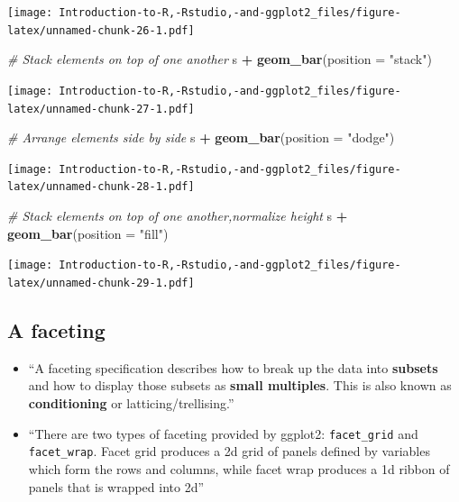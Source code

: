 \documentclass[]{book}
\newenvironment{Shaded}{\begin{snugshade}}{\end{snugshade}}
\newcommand{\CommentTok}[1]{\textcolor[rgb]{0.56,0.35,0.01}{\textit{#1}}}
\newcommand{\DataTypeTok}[1]{\textcolor[rgb]{0.13,0.29,0.53}{#1}}
\newcommand{\KeywordTok}[1]{\textcolor[rgb]{0.13,0.29,0.53}{\textbf{#1}}}
\newcommand{\NormalTok}[1]{#1}
\newcommand{\OperatorTok}[1]{\textcolor[rgb]{0.81,0.36,0.00}{\textbf{#1}}}
\newcommand{\StringTok}[1]{\textcolor[rgb]{0.31,0.60,0.02}{#1}}
\begin{document}
\texttt{[image: Introduction-to-R,-Rstudio,-and-ggplot2\_files/figure-latex/unnamed-chunk-26-1.pdf]}

\begin{Shaded}
\begin{Highlighting}[]
\CommentTok{# Stack elements on top of one another}
\NormalTok{s }\OperatorTok{+}\StringTok{ }\KeywordTok{geom_bar}\NormalTok{(}\DataTypeTok{position =} \StringTok{"stack"}\NormalTok{)}
\end{Highlighting}
\end{Shaded}

\texttt{[image: Introduction-to-R,-Rstudio,-and-ggplot2\_files/figure-latex/unnamed-chunk-27-1.pdf]}

\begin{Shaded}
\begin{Highlighting}[]
\CommentTok{# Arrange elements side by side}
\NormalTok{s }\OperatorTok{+}\StringTok{ }\KeywordTok{geom_bar}\NormalTok{(}\DataTypeTok{position =} \StringTok{"dodge"}\NormalTok{)}
\end{Highlighting}
\end{Shaded}

\texttt{[image: Introduction-to-R,-Rstudio,-and-ggplot2\_files/figure-latex/unnamed-chunk-28-1.pdf]}

\begin{Shaded}
\begin{Highlighting}[]
\CommentTok{# Stack elements on top of one another,normalize height}
\NormalTok{s }\OperatorTok{+}\StringTok{ }\KeywordTok{geom_bar}\NormalTok{(}\DataTypeTok{position =} \StringTok{"fill"}\NormalTok{)}
\end{Highlighting}
\end{Shaded}

\texttt{[image: Introduction-to-R,-Rstudio,-and-ggplot2\_files/figure-latex/unnamed-chunk-29-1.pdf]}

\hypertarget{a-faceting}{%
\subsection{A faceting}\label{a-faceting}}

\begin{itemize}
\item
  ``A faceting specification describes how to break up the data into \textbf{subsets} and how to display those subsets as \textbf{small multiples}. This is also known as \textbf{conditioning} or latticing/trellising.'' \citep{ggplot2}
\item
  ``There are two types of faceting provided by ggplot2: \texttt{facet\_grid} and \texttt{facet\_wrap}. Facet grid produces a 2d grid of panels defined by variables which form the rows and columns, while facet wrap produces a 1d ribbon of panels that is wrapped into 2d'' \citep{ggplot2}
\end{itemize}
\end{document}
